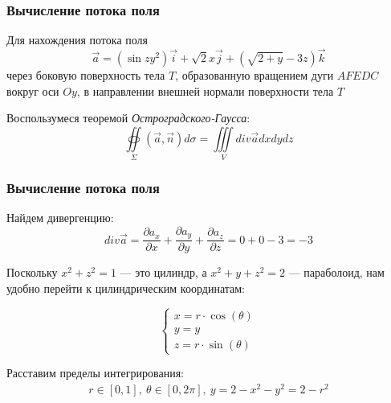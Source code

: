 \begin{frame}\frametitle{Вычисление потока поля}
	Для нахождения потока поля
	\begin{equation*}
		\vec a = (\sin zy^2) \vec i + \sqrt{2} x \vec j + (\sqrt{2+y} -3z) \vec k
	\end{equation*}
	через боковую поверхность тела \(T\), образованную вращением дуги \(AFEDC\)
	вокруг оси \(Oy\), в направлении внешней нормали поверхности тела \(T\)


	Воспользумеся теоремой \textit{Остроградского-Гаусса}:
	\begin{equation*}
		\oiint\limits_{\Sigma}\left( \vec {a}, \vec {n} \right) d\sigma = \iiint\limits_V div \vec {a} dxdydz
	\end{equation*}
\end{frame}


\begin{frame}\frametitle{Вычисление потока поля}
	Найдем дивергенцию:
	\begin{equation*}
		div \vec a = \frac{\partial a_x}{\partial x} +  \frac{\partial a_y}{\partial y} +  \frac{\partial a_z}{\partial z} = 0 + 0 - 3 = -3
	\end{equation*}

	Поскольку $x^2 + z^2 = 1$ — это цилиндр, а $x^2 + y + z^2 = 2$ — параболоид, нам удобно перейти к цилиндрическим координатам:

	\begin{equation*}
		\begin{cases}
			x = r \cdot \cos(\theta) \\
			y = y                    \\
			z = r \cdot \sin(\theta)
		\end{cases}
	\end{equation*}

	Расставим пределы интегрирования:
	\begin{align*}
		r \in [0, 1], \
		\theta \in [0, 2\pi], \
		y = 2 - x^2 - y^2 = 2 - r^2
	\end{align*}
\end{frame}

